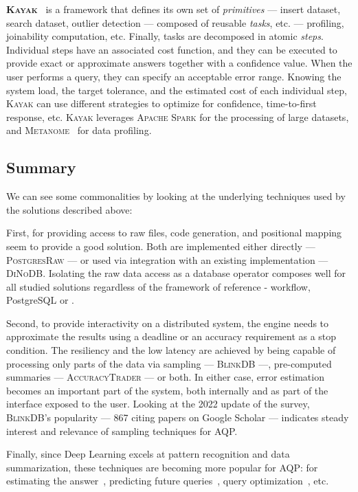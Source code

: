 \medskip

\textbf{\textsc{Kayak}}~\cite{maccioni_crossing_2017} is a framework that defines its own
set of \textit{primitives} --- insert dataset, search dataset, outlier detection --- composed of 
reusable \textit{tasks}, etc. --- profiling, joinability computation, etc. Finally, tasks
are decomposed in atomic \textit{steps}.
Individual steps have an associated cost function, and they can be executed to provide exact
or approximate answers together with a confidence value. When the user performs a query, they can
specify an acceptable error range. Knowing the system load, the target tolerance, and the estimated
cost of each individual step, \textsc{Kayak} can use different strategies to optimize for confidence,
time-to-first response, etc.
\textsc{Kayak} leverages \textsc{Apache Spark} for the processing of
large datasets, and \textsc{Metanome}~\cite{papenbrock2015data} for data profiling.

\subsection{Summary}
We can see some commonalities by looking at the underlying techniques used by the 
solutions described above:

First, for providing access to raw files, code generation, and positional 
mapping seem to provide a good solution. Both are implemented either directly --- 
\textsc{PostgresRaw} --- or used via integration with an existing implementation --- \textsc{DiNoDB}.
Isolating the raw data access as a database operator composes well for all 
studied solutions regardless of the framework of reference - workflow, 
PostgreSQL or \scidb.

Second, to provide interactivity on a distributed system, the engine 
needs to approximate the results using a deadline or an accuracy requirement as 
a stop condition. The resiliency and the low latency are achieved by 
being capable of processing only parts of the data via sampling --- \textsc{BlinkDB} ---, 
pre-computed summaries --- \textsc{AccuracyTrader} --- or both. In either case, error 
estimation becomes an important part of the system, both internally and as 
part of the interface exposed to the user.
Looking at the 2022 update of the survey, \textsc{BlinkDB}'s popularity --- 867 citing papers
on Google Scholar --- indicates steady interest and relevance of sampling techniques for \gls{AQP}.

Finally, since Deep Learning excels at pattern recognition and data summarization,
these techniques are becoming more popular for \gls{AQP}: for estimating the 
answer~\cite{regev_approximating_2021,thirumuruganathan_approximate_2020}, predicting
future queries~\cite{shahrivari_workload_2022,meduri_evaluation_2021}, query
optimization~\cite{bi_learningbased_2022}, etc.


